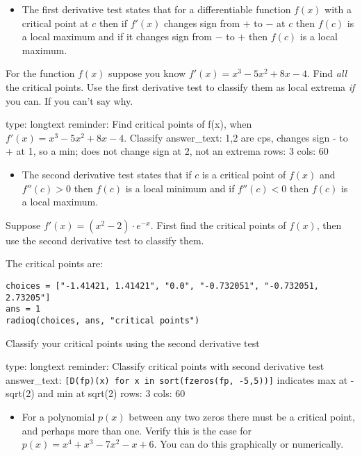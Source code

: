 \documentclass[12pt]{article}
\begin{document}
\begin{itemize}
\itemsep1pt\parskip0pt
\item
  The first derivative test states that for a differentiable function
  $f(x)$ with a critical point at $c$ then if $f'(x)$ changes sign from
  $+$ to $-$ at $c$ then $f(c)$ is a local maximum and if it changes
  sign from $-$ to $+$ then $f(c)$ is a local maximum.
\end{itemize}

For the function $f(x)$ suppose you know $f'(x)=x^3 - 5x^2 + 8x - 4$.
Find \emph{all} the critical points. Use the first derivative test to
classify them as local extrema \emph{if} you can. If you can't say why.

\begin{answer}
type: longtext
reminder: Find critical points of f(x), when \( f'(x)=x^3 - 5x^2 + 8x -4 \). Classify
answer_text: 1,2 are cps, changes sign - to + at 1, so a min; does not change sign at 2, not an extrema 
rows: 3
cols: 60
\end{answer}

\begin{itemize}
\itemsep1pt\parskip0pt
\item
  The second derivative test states that if $c$ is a critical point of
  $f(x)$ and $f''(c) > 0$ then $f(c)$ is a local minimum and if
  $f''(c) < 0$ then $f(c)$ is a local maximum.
\end{itemize}

Suppose $f'(x) = (x^2 - 2) \cdot e^{-x}$. First find the critical points
of $f(x)$, then use the second derivative test to classify them.

The critical points are:



\begin{verbatim}
choices = ["-1.41421, 1.41421", "0.0", "-0.732051", "-0.732051, 2.73205"]
ans = 1
radioq(choices, ans, "critical points")
\end{verbatim}
Classify your critical points using the second derivative test

\begin{answer}
type: longtext
reminder: Classify critical points with second derivative test
answer_text: \verb+[D(fp)(x) for x in sort(fzeros(fp, -5,5))]+ indicates max at -sqrt(2) and min at sqrt(2) 
rows: 3
cols: 60
\end{answer}

\begin{itemize}
\itemsep1pt\parskip0pt
\item
  For a polynomial $p(x)$ between any two zeros there must be a critical
  point, and perhaps more than one. Verify this is the case for
  $p(x) =x^4 + x^3 - 7x^2 - x + 6$. You can do this graphically or
  numerically.
\end{itemize}
\end{document}
